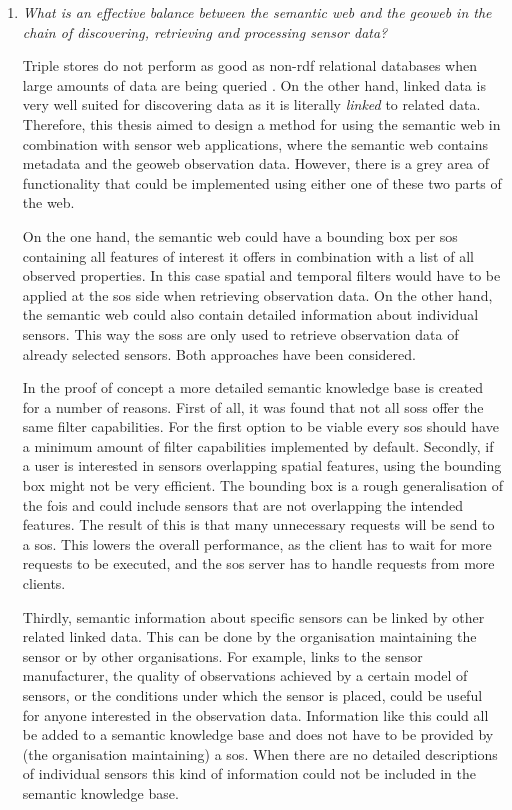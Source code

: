 \begin{enumerate}
\item \textit{What is an effective balance between the semantic web and the geoweb in the chain of discovering, retrieving and processing sensor data?}%

Triple stores do not perform as good as non-\ac{rdf} relational databases when large amounts of data are being queried \citep{LD:Bizer2}. On the other hand, linked data is very well suited for discovering data as it is literally \textit{linked} to related data. Therefore, this thesis aimed to design a method for using the semantic web in combination with sensor web applications, where the semantic web contains metadata and the geoweb observation data. However, there is a grey area of functionality that could be implemented using either one of these two parts of the web. 

On the one hand, the semantic web could have a bounding box per \ac{sos} containing all features of interest it offers in combination with a list of all observed properties. In this case spatial and temporal filters would have to be applied at the \ac{sos} side when retrieving observation data. On the other hand, the semantic web could also contain detailed information about individual sensors. This way the \aclp{sos} are only used to retrieve observation data of already selected sensors. Both approaches have been considered.

In the proof of concept a more detailed semantic knowledge base is created for a number of reasons. First of all, it was found that not all \aclp{sos} offer the same filter capabilities. For the first option to be viable every \ac{sos} should have a minimum amount of filter capabilities implemented by default. 
Secondly, if a user is interested in sensors overlapping spatial features, using the bounding box might not be very efficient. The bounding box is a rough generalisation of the \acp{foi} and could include sensors that are not overlapping the intended features. The result of this is that many unnecessary requests will be send to a \ac{sos}. This lowers the overall performance, as the client has to wait for more requests to be executed, and the \ac{sos} server has to handle requests from more clients. 

Thirdly, semantic information about specific sensors can be linked by other related linked data. This can be done by the organisation maintaining the sensor or by other organisations. For example, links to the sensor manufacturer, the quality of observations achieved by a certain model of sensors, or the conditions under which the sensor is placed, could be useful for anyone interested in the observation data. Information like this could all be added to a semantic knowledge base and does not have to be provided by (the organisation maintaining) a \ac{sos}. When there are no detailed descriptions of individual sensors this kind of information could not be included in the semantic knowledge base. 


\end{enumerate}
